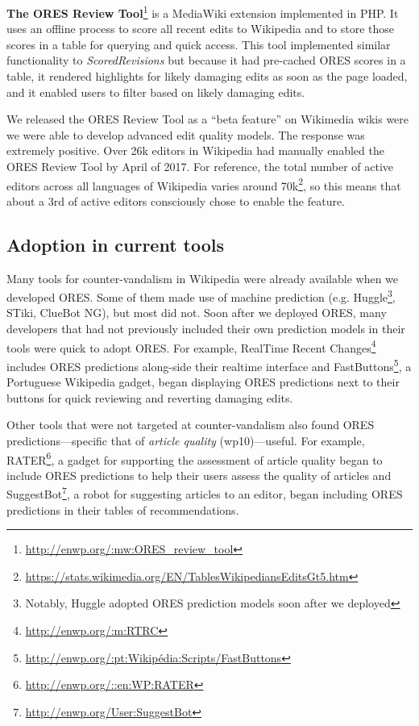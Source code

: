 \textbf{The ORES Review Tool}\footnote{\url{http://enwp.org/:mw:ORES_review_tool}} is a MediaWiki extension implemented in PHP.  It uses an offline process to score all recent edits to Wikipedia and to store those scores in a table for querying and quick access.  This tool implemented similar functionality to \emph{ScoredRevisions} but because it had pre-cached ORES scores in a table, it rendered highlights for likely damaging edits as soon as the page loaded, and it enabled users to filter based on likely damaging edits.

We released the ORES Review Tool as a ``beta feature'' on Wikimedia wikis were we were able to develop advanced edit quality models.  The response was extremely positive.  Over 26k editors in Wikipedia had manually enabled the ORES Review Tool by April of 2017.  For reference, the total number of active editors across all languages of Wikipedia varies around 70k\footnote{\url{https://stats.wikimedia.org/EN/TablesWikipediansEditsGt5.htm}}, so this means that about a 3rd of active editors consciously chose to enable the feature.

\subsection{Adoption in current tools}
Many tools for counter-vandalism in Wikipedia were already available when we developed ORES.  Some of them made use of machine prediction (e.g. Huggle\footnote{Notably, Huggle adopted ORES prediction models soon after we deployed}, STiki, ClueBot NG), but most did not.  Soon after we deployed ORES, many developers that had not previously included their own prediction models in their tools were quick to adopt ORES.  For example, RealTime Recent Changes\footnote{\url{http://enwp.org/:m:RTRC}} includes ORES predictions along-side their realtime interface and FastButtons\footnote{\url{http://enwp.org/:pt:Wikipédia:Scripts/FastButtons}}, a Portuguese Wikipedia gadget, began displaying ORES predictions next to their buttons for quick reviewing and reverting damaging edits.

Other tools that were not targeted at counter-vandalism also found ORES predictions---specific that of \emph{article quality} (wp10)---useful.  For example, RATER\footnote{\url{http://enwp.org/::en:WP:RATER}}, a gadget for supporting the assessment of article quality began to include ORES predictions to help their users assess the quality of articles and SuggestBot\footnote{\url{http://enwp.org/User:SuggestBot}}\cite{cosley2007suggestbot}, a robot for suggesting articles to an editor, began including ORES predictions in their tables of recommendations.

